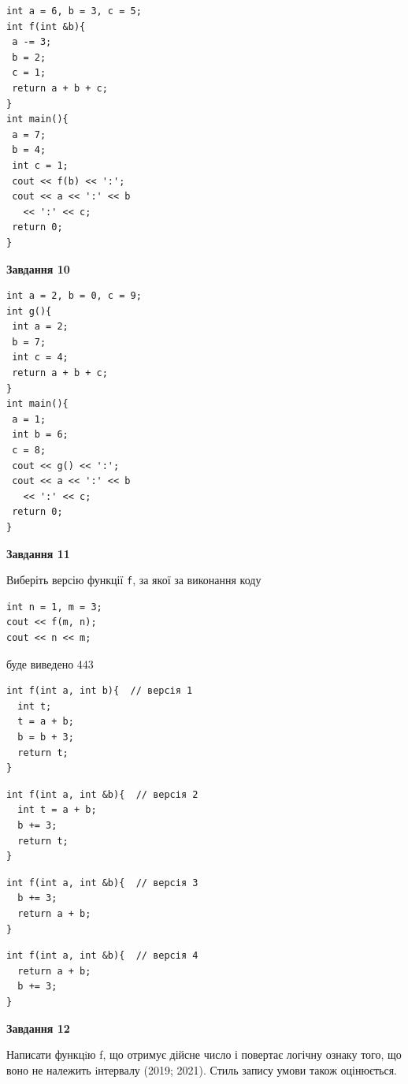 \documentclass[12pt, ukrainian]{article}
\def\code#1{\Verb!#1!}
\begin{document}
{\begin {large}
\begin{minipage}[t]{7.0cm}
\begin{verbatim}
int a = 6, b = 3, c = 5;
int f(int &b){
 a -= 3;
 b = 2;
 c = 1;
 return a + b + c;
}
int main(){
 a = 7;
 b = 4;
 int c = 1;
 cout << f(b) << ':';
 cout << a << ':' << b 
   << ':' << c;
 return 0;
}
\end{verbatim}



\begin{center}
\textbf{Завдання 10}
\end{center}
\vspace{-8mm}

\begin{verbatim}
int a = 2, b = 0, c = 9;
int g(){
 int a = 2;
 b = 7;
 int c = 4;
 return a + b + c;
}
int main(){
 a = 1;
 int b = 6;
 c = 8;
 cout << g() << ':';
 cout << a << ':' << b 
   << ':' << c;
 return 0;
}
\end{verbatim}

\end{minipage}
\vline \hspace{1mm}
\begin{minipage}[t]{11.0cm}

\begin{center}
\textbf{Завдання 11}
\end{center}
Виберіть версію функції \code{f}, за якої за виконання коду
\begin{verbatim}
int n = 1, m = 3;
cout << f(m, n);
cout << n << m;
\end{verbatim}

буде виведено 443

\begin{verbatim}
int f(int a, int b){  // версія 1
  int t;
  t = a + b;
  b = b + 3;
  return t;
}
\end{verbatim}

\vspace{-8mm}\begin{verbatim}
int f(int a, int &b){  // версія 2
  int t = a + b;
  b += 3;
  return t;
}
\end{verbatim}

\vspace{-8mm}\begin{verbatim}
int f(int a, int &b){  // версія 3
  b += 3;
  return a + b;
}
\end{verbatim}

\vspace{-8mm}\begin{verbatim}
int f(int a, int &b){  // версія 4
  return a + b;
  b += 3;
}
\end{verbatim}



\begin{center}
\textbf{Завдання 12}
\end{center}

Написати функцiю f, що отримує дійсне число і повертає логічну ознаку того, що воно не належить iнтервалу (2019; 2021). Стиль запису умови також оцінюється.\par

\end{minipage}

\end {large}}
\end{document}
